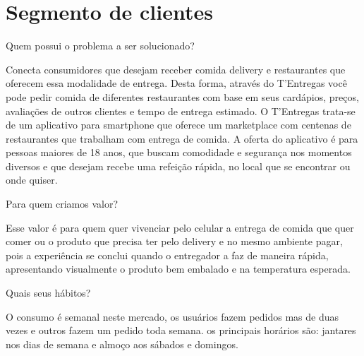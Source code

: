 \section{\textbf{Segmento de clientes}}
\label{sec: Segmento de clientes}


\begin{commentA} \vspace{0.3cm} \noindent Quem possui o problema a ser solucionado? \par \vspace{0.1cm} \end{commentA}


Conecta consumidores que desejam receber comida delivery e restaurantes que oferecem essa modalidade de entrega. Desta forma, através do T'Entregas você pode pedir comida de diferentes restaurantes com base em seus cardápios, preços, avaliações de outros clientes e tempo de entrega estimado. O T'Entregas trata-se de um aplicativo para smartphone que oferece um marketplace com centenas de restaurantes que trabalham com entrega de comida. A oferta do aplicativo é para pessoas maiores de 18 anos, que buscam comodidade e segurança nos momentos diversos e que desejam recebe uma refeição rápida, no local que se encontrar ou onde quiser.\par


\begin{commentA} \vspace{0.3cm} \noindent Para quem criamos valor? \par \vspace{0.1cm} \end{commentA}


Esse valor é para quem quer vivenciar pelo celular a entrega de comida que quer comer ou o produto que precisa ter pelo delivery e no mesmo ambiente pagar, pois a experiência se conclui quando o entregador a faz de maneira rápida, apresentando visualmente o produto bem embalado e na temperatura esperada.\par


\begin{commentA} \vspace{0.3cm} \noindent Quais seus hábitos? \par \vspace{0.1cm} \end{commentA}


O consumo é semanal neste mercado, os usuários fazem pedidos mas de duas vezes e outros fazem um pedido toda semana. os principais horários são: jantares nos dias de semana e almoço aos sábados e domingos.


